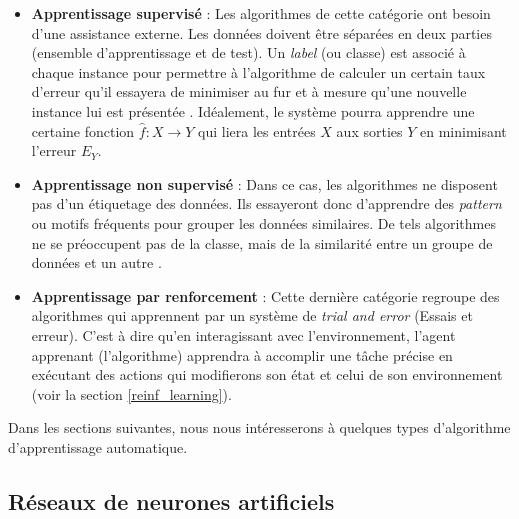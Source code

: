 \begin{itemize}
	\item  \textbf{Apprentissage supervisé} : Les algorithmes de cette catégorie ont besoin d'une assistance externe. Les données doivent être séparées en deux parties (ensemble d'apprentissage et de test). Un \textit{label} (ou classe) est associé à chaque instance pour permettre à l'algorithme de calculer un certain taux d'erreur qu'il essayera de minimiser au fur et à mesure qu'une nouvelle instance lui est présentée \citep{supervised_learning}. Idéalement, le système pourra apprendre une certaine fonction $\hat{f} : X \rightarrow Y$ qui liera les entrées $X$ aux sorties $Y$ en minimisant l'erreur $E_Y$.
	
	\item \textbf{Apprentissage non supervisé} : Dans ce cas, les algorithmes ne disposent pas d'un étiquetage des données. Ils essayeront donc d'apprendre des \textit{pattern} ou motifs fréquents pour grouper les données similaires. De tels algorithmes ne se préoccupent pas de la classe, mais de la similarité entre un groupe de données et un autre \citep{unsupervised_learning}.
	
	\item \textbf{Apprentissage par renforcement} : Cette dernière catégorie regroupe des algorithmes qui apprennent par un système de \textit{trial and error} (Essais et erreur). C'est à dire qu'en interagissant avec l'environnement, l'agent apprenant (l'algorithme) apprendra à accomplir une tâche précise en exécutant des actions qui modifierons son état et celui de son environnement (voir la section \ref{reinf_learning}).
\end{itemize}
\par
Dans les sections suivantes, nous nous intéresserons à quelques types d'algorithme d'apprentissage automatique. 
\subsection{Réseaux de neurones artificiels}
